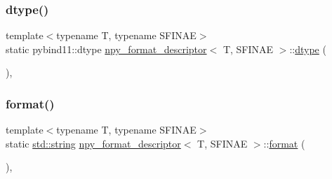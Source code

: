 \subsubsection{\texorpdfstring{dtype()}{dtype()}}
{\footnotesize\ttfamily template$<$typename T, typename S\+F\+I\+N\+AE$>$ \\
static pybind11\+::dtype \mbox{\hyperlink{structnpy__format__descriptor}{npy\+\_\+format\+\_\+descriptor}}$<$ T, S\+F\+I\+N\+AE $>$\+::\mbox{\hyperlink{classdtype}{dtype}} (\begin{DoxyParamCaption}{ }\end{DoxyParamCaption})\hspace{0.3cm}{\ttfamily [inline]}, {\ttfamily [static]}}

\mbox{\label{structnpy__format__descriptor_adb679e564c19db5f7b434b12f92b2488}} 
\subsubsection{\texorpdfstring{format()}{format()}}
{\footnotesize\ttfamily template$<$typename T, typename S\+F\+I\+N\+AE$>$ \\
static \mbox{\hyperlink{_s_d_l__opengl__glext_8h_ab4ccfaa8ab0e1afaae94dc96ef52dde1}{std\+::string}} \mbox{\hyperlink{structnpy__format__descriptor}{npy\+\_\+format\+\_\+descriptor}}$<$ T, S\+F\+I\+N\+AE $>$\+::\mbox{\hyperlink{_s_d_l__audio_8h_a71a65ffd977afe9c3fef116a5bc9ee27}{format}} (\begin{DoxyParamCaption}{ }\end{DoxyParamCaption})\hspace{0.3cm}{\ttfamily [inline]}, {\ttfamily [static]}}

\mbox{\label{structnpy__format__descriptor_afc2225aad13f5b6ccdc2267a824d7d77}} 
